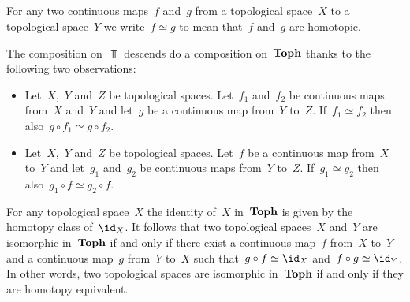 \subsection{}

For any two continuous maps~$f$ and~$g$ from a topological space~$X$ to a topological space~$Y$ we write~$f \simeq g$ to mean that~$f$ and~$g$ are homotopic.

The composition on~$\Top$ descends do a composition on~$\mathbf{Toph}$ thanks to the following two observations:
\begin{itemize}
	\item
		Let~$X$,~$Y$ and~$Z$ be topological spaces.
		Let~$f_1$ and~$f_2$ be continuous maps from~$X$ and~$Y$ and let~$g$ be a continuous map from~$Y$ to~$Z$.
		If~$f_1 \simeq f_2$ then also~$g \circ f_1 \simeq g \circ f_2$.
	\item
		Let~$X$,~$Y$ and~$Z$ be topological spaces.
		Let~$f$ be a continuous map from~$X$ to~$Y$ and let~$g_1$ and~$g_2$ be continuous maps from~$Y$ to~$Z$.
		If~$g_1 \simeq g_2$ then also~$g_1 \circ f \simeq g_2 \circ f$.
\end{itemize}

For any topological space~$X$ the identity of~$X$ in~$\mathbf{Toph}$ is given by the homotopy class of~$\id_X$.
It follows that two topological spaces~$X$ and~$Y$ are isomorphic in~$\mathbf{Toph}$ if and only if there exist a continuous map~$f$ from~$X$ to~$Y$ and a continuous map~$g$ from~$Y$ to~$X$ such that~$g \circ f \simeq \id_X$ and~$f \circ g \simeq \id_Y$.
In other words, two topological spaces are isomorphic in~$\mathbf{Toph}$ if and only if they are homotopy equivalent.


